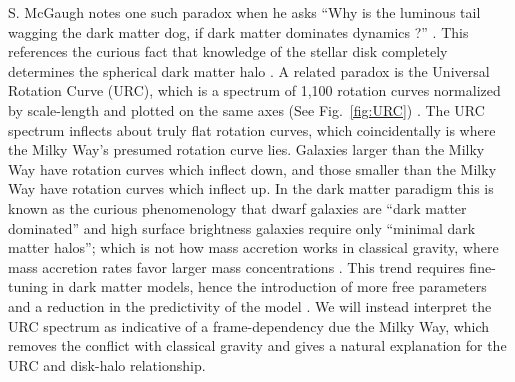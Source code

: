 \documentclass[reprint,%
 amsmath,amssymb,
 aps,
]{revtex4-1}
\begin{document}
  S. McGaugh  notes one such paradox when he asks   ``Why is the luminous tail wagging the dark matter dog,  if dark matter dominates dynamics ?'' \cite{1999McGaugh,McGaugh2016RAR}. This references the  curious fact   that knowledge  of 
 the   stellar   disk   completely  determines the spherical dark matter halo \cite{2004ApJ...609..652M}. A   related paradox is the Universal Rotation Curve (URC), which is a spectrum of   1,100  rotation curves normalized by scale-length and plotted on the same axes 
 (See Fig.~\ref{fig:URC})  \cite{salucci,Persic,1978Rubin,10.1111/j.1365-2966.2007.11696.x}. The URC spectrum   inflects about   truly flat rotation curves,  which   coincidentally is where the Milky Way's presumed rotation curve lies.  Galaxies larger than the Milky Way have 
 rotation curves which    inflect down, and those   smaller than the Milky Way have rotation curves which inflect up.
 In the dark matter paradigm this is known as the curious phenomenology that dwarf galaxies are ``dark matter dominated'' and high surface brightness galaxies require only ``minimal dark matter halos''; which is not how mass accretion works in classical gravity, where  mass accretion rates favor   larger mass concentrations \cite{10.1093/mnras/stt2403}. This trend requires fine-tuning in dark matter models, hence the introduction of more free parameters and a reduction in the predictivity of the model   \cite{MCGAUGH2021220}. 
  We will instead interpret the URC spectrum as indicative of   a frame-dependency due the Milky Way, which removes the conflict with classical gravity and gives a natural explanation for the URC and disk-halo relationship.

 
   
\end{document}

